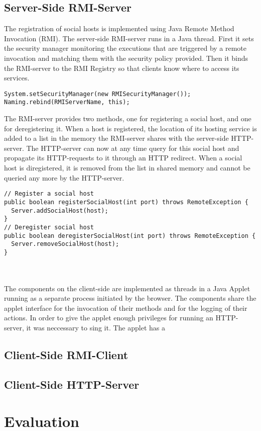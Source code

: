 \documentclass[a4paper, 10pt]{article}
\begin{document}
\subsection{Server-Side RMI-Server}
The registration of social hosts is implemented using Java Remote Method Invocation (RMI). The server-side RMI-server runs in a Java thread. First it sets the security manager monitoring the executions that are triggered by a remote invocation and matching them with the security policy provided. Then it binds the RMI-server to the RMI Registry so that clients know where to access its services.
\begin{lstlisting}
System.setSecurityManager(new RMISecurityManager());
Naming.rebind(RMIServerName, this);
\end{lstlisting}
The RMI-server provides two methods, one for registering a social host, and one for deregistering it. When a host is registered, the location of its hosting service is added to a list in the memory the RMI-server shares with the server-side HTTP-server. The HTTP-server can now at any time query for this social host and propagate its HTTP-requests to it through an HTTP redirect. When a social host is diregistered, it is removed from the list in shared memory and cannot be queried any more by the HTTP-server.
\begin{lstlisting}
// Register a social host
public boolean registerSocialHost(int port) throws RemoteException {
  Server.addSocialHost(host);
}
// Deregister social host
public boolean deregisterSocialHost(int port) throws RemoteException {
  Server.removeSocialHost(host);
}
\end{lstlisting}
~\\
\\
The components on the client-side are implemented as threads in a Java Applet running as a separate process initiated by the browser. The components share the applet interface for the invocation of their methods and for the logging of their actions. In order to give the applet enough privileges for running an HTTP-server, it was neccessary to sing it. The applet has a 

\subsection{Client-Side RMI-Client}

\subsection{Client-Side HTTP-Server}

\section{Evaluation}




\begin{lstlisting}
\end{lstlisting}
\end{document}
